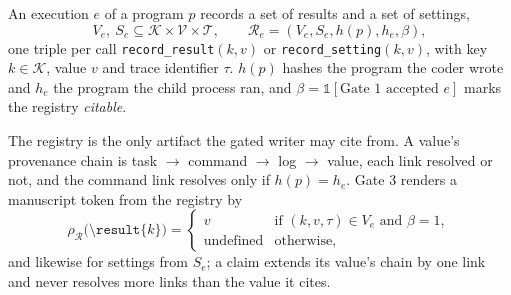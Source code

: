 \documentclass[sigconf,anonymous]{aamas}
\newcommand{\Reg}{\mathcal{R}}
\newcommand{\Keys}{\mathcal{K}}
\newcommand{\ind}{\mathbb{1}}
\begin{document}
\begin{definition}
\label{def:registry}
An execution $e$ of a program $p$ records a set of results and a set of settings,
\begin{equation}
\label{eq:registry}
V_e,\ S_e \subseteq \Keys \times \mathcal{V} \times \mathcal{T}, \qquad \Reg_e = (V_e, S_e, h(p), h_e, \beta),
\end{equation}
one triple per call \texttt{record\_\allowbreak result}$(k, v)$ or \texttt{record\_\allowbreak setting}$(k, v)$, with key $k \in \Keys$, value $v$ and trace identifier $\tau$.
$h(p)$ hashes the program the coder wrote and $h_e$ the program the child process ran, and $\beta = \ind[\text{Gate 1 accepted } e]$ marks the registry \emph{citable}.
\end{definition}

The registry is the only artifact the gated writer may cite from.
A value's provenance chain is task $\to$ command $\to$ log $\to$ value, each link resolved or not, and the command link resolves only if $h(p) = h_e$.
Gate 3 renders a manuscript token from the registry by
\begin{equation}
\label{eq:render}
\rho_{\Reg}\big(\texttt{\textbackslash result}\{k\}\big) =
\begin{cases}
v & \text{if } (k, v, \tau) \in V_e \text{ and } \beta = 1, \\
\text{undefined} & \text{otherwise,}
\end{cases}
\end{equation}
and likewise for settings from $S_e$; a claim extends its value's chain by one link and never resolves more links than the value it cites.
\end{document}
